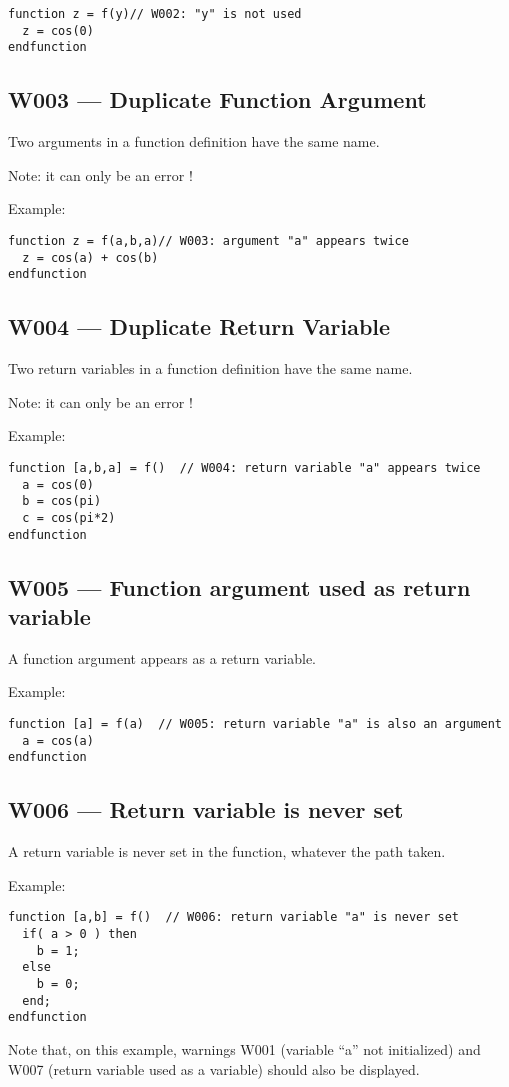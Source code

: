 \documentclass{article}
\begin{document}
\begin{verbatim}
function z = f(y)// W002: "y" is not used
  z = cos(0)  
endfunction
\end{verbatim}

\subsection{W003 --- Duplicate Function Argument}

Two arguments in a function definition have the same name. 

Note: it can only be an error !

Example:
\begin{verbatim}
function z = f(a,b,a)// W003: argument "a" appears twice
  z = cos(a) + cos(b)
endfunction
\end{verbatim}

\subsection{W004 --- Duplicate Return Variable}

Two return variables in a function definition have the same name.

Note: it can only be an error !

Example:
\begin{verbatim}
function [a,b,a] = f()  // W004: return variable "a" appears twice
  a = cos(0)
  b = cos(pi)
  c = cos(pi*2)
endfunction
\end{verbatim}

\subsection{W005 --- Function argument used as return variable}

A function argument appears as a return variable.

Example:
\begin{verbatim}
function [a] = f(a)  // W005: return variable "a" is also an argument
  a = cos(a)
endfunction
\end{verbatim}

\subsection{W006 --- Return variable is never set}

A return variable is never set in the function, whatever the path taken.

Example:
\begin{verbatim}
function [a,b] = f()  // W006: return variable "a" is never set
  if( a > 0 ) then
    b = 1;
  else
    b = 0;
  end;
endfunction
\end{verbatim}
Note that, on this example, warnings W001 (variable ``a'' not initialized)
and W007 (return variable used as a variable) should also be displayed.
\end{document}
